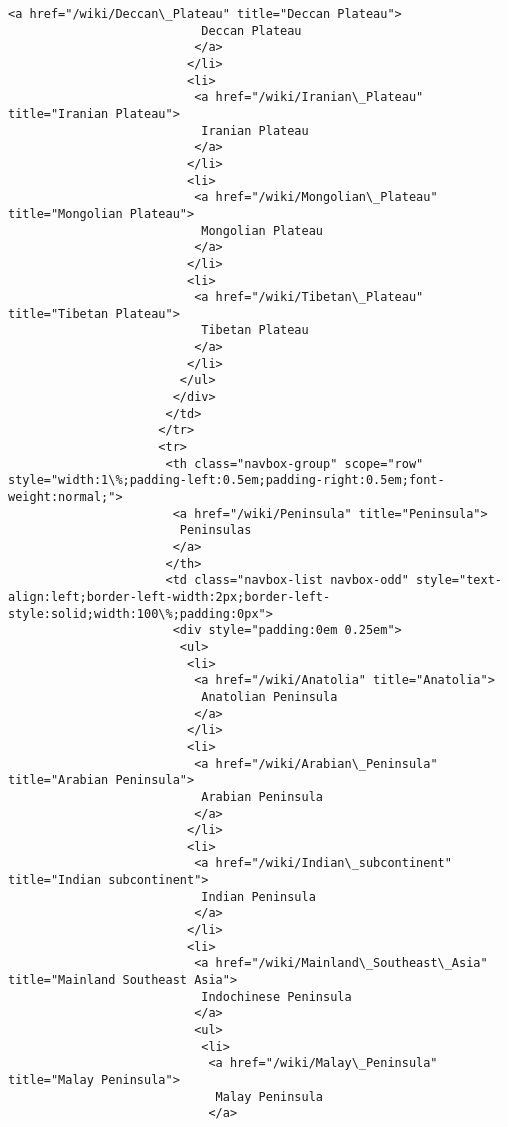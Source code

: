 \documentclass[11pt]{article}
\begin{document}
\begin{Verbatim}[commandchars=\\\{\}]
                          <a href="/wiki/Deccan\_Plateau" title="Deccan Plateau">
                           Deccan Plateau
                          </a>
                         </li>
                         <li>
                          <a href="/wiki/Iranian\_Plateau" title="Iranian Plateau">
                           Iranian Plateau
                          </a>
                         </li>
                         <li>
                          <a href="/wiki/Mongolian\_Plateau" title="Mongolian Plateau">
                           Mongolian Plateau
                          </a>
                         </li>
                         <li>
                          <a href="/wiki/Tibetan\_Plateau" title="Tibetan Plateau">
                           Tibetan Plateau
                          </a>
                         </li>
                        </ul>
                       </div>
                      </td>
                     </tr>
                     <tr>
                      <th class="navbox-group" scope="row" style="width:1\%;padding-left:0.5em;padding-right:0.5em;font-weight:normal;">
                       <a href="/wiki/Peninsula" title="Peninsula">
                        Peninsulas
                       </a>
                      </th>
                      <td class="navbox-list navbox-odd" style="text-align:left;border-left-width:2px;border-left-style:solid;width:100\%;padding:0px">
                       <div style="padding:0em 0.25em">
                        <ul>
                         <li>
                          <a href="/wiki/Anatolia" title="Anatolia">
                           Anatolian Peninsula
                          </a>
                         </li>
                         <li>
                          <a href="/wiki/Arabian\_Peninsula" title="Arabian Peninsula">
                           Arabian Peninsula
                          </a>
                         </li>
                         <li>
                          <a href="/wiki/Indian\_subcontinent" title="Indian subcontinent">
                           Indian Peninsula
                          </a>
                         </li>
                         <li>
                          <a href="/wiki/Mainland\_Southeast\_Asia" title="Mainland Southeast Asia">
                           Indochinese Peninsula
                          </a>
                          <ul>
                           <li>
                            <a href="/wiki/Malay\_Peninsula" title="Malay Peninsula">
                             Malay Peninsula
                            </a>

\end{Verbatim}
\end{document}
